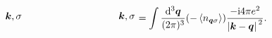 \begin{equation}
\begin{gathered}
\begin{tikzpicture}[x=0.75pt,y=0.75pt,yscale=-1,xscale=1]
            \draw (272,240) node [anchor=east] [inner sep=0.75pt]    {$\boldsymbol{k} , \sigma $};
            \draw (400.44,239.78) node [anchor=west] [inner sep=0.75pt]    {$\boldsymbol{k} , \sigma$};
            \end{tikzpicture}            
    \end{gathered} = \int \frac{\dd[3]{\vb*{q}}}{(2\pi)^3} (- \expval{n_{\vb*{q} \sigma}}) \frac{- \ii 4 \pi e^2}{\abs*{\vb*{k} - \vb*{q}}^2} .
\end{equation}